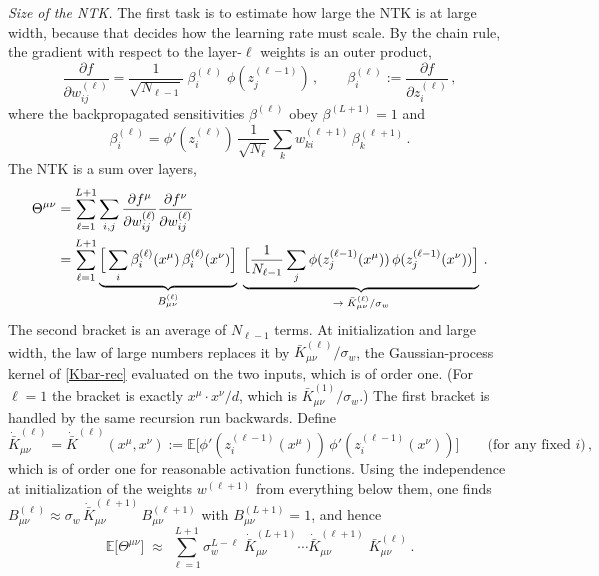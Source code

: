 \documentclass[11pt]{article}
\newcommand{\E}{\mathbb{E}}
\newcommand{\pd}{\partial}
\begin{document}
\emph{Size of the NTK.} The first task is to estimate how large the NTK is at large width, because that decides how the learning rate must scale. By the chain rule, the gradient with respect to the layer-$\ell$ weights is an outer product,
%
\begin{equation}
    \frac{\pd f}{\pd w^{(\ell)}_{ij}} = \frac{1}{\sqrt{N_{\ell-1}}}\;\beta^{(\ell)}_i\;\phi(z^{(\ell-1)}_j)\,,\qquad \beta^{(\ell)}_i := \frac{\pd f}{\pd z^{(\ell)}_i}\,,
\end{equation}
%
where the backpropagated sensitivities $\beta^{(\ell)}$ obey $\beta^{(L+1)} = 1$ and
%
\begin{equation}
    \beta^{(\ell)}_i = \phi'(z^{(\ell)}_i)\,\frac{1}{\sqrt{N_\ell}}\sum_k w^{(\ell+1)}_{ki}\,\beta^{(\ell+1)}_k\,.
\end{equation}
%
The NTK is a sum over layers,
%
\begin{align}
    \Theta^{\mu\nu} &= \sum_{\ell=1}^{L+1}\sum_{i,j}\frac{\pd f^\mu}{\pd w^{(\ell)}_{ij}}\frac{\pd f^\nu}{\pd w^{(\ell)}_{ij}} \notag \\
    &= \sum_{\ell=1}^{L+1} \underbrace{\Big[\sum_i \beta^{(\ell)}_i(x^\mu)\,\beta^{(\ell)}_i(x^\nu)\Big]}_{B^{(\ell)}_{\mu\nu}}\;
    \underbrace{\Big[\frac{1}{N_{\ell-1}}\sum_j \phi(z^{(\ell-1)}_j(x^\mu))\,\phi(z^{(\ell-1)}_j(x^\nu))\Big]}_{\to\;\bar K^{(\ell)}_{\mu\nu}/\sigma_w}\,. \label{NTK-layers}
\end{align}
%
The second bracket is an average of $N_{\ell-1}$ terms. At initialization and large width, the law of large numbers replaces it by $\bar K^{(\ell)}_{\mu\nu}/\sigma_w$, the Gaussian-process kernel of \eqref{Kbar-rec} evaluated on the two inputs, which is of order one. (For $\ell=1$ the bracket is exactly $x^\mu\cdot x^\nu/d$, which is $\bar K^{(1)}_{\mu\nu}/\sigma_w$.) The first bracket is handled by the same recursion run backwards. Define
%
\begin{equation}
    \dot{\bar K}^{(\ell)}_{\mu\nu} = \dot{\bar K}^{(\ell)}(x^\mu,x^\nu):= \E\big[ \phi'(z^{(\ell-1)}_i(x^\mu))\,\phi'(z^{(\ell-1)}_i(x^\nu))\big] \qquad \text{(for any fixed $i$)}\,,
\end{equation}
%
which is of order one for reasonable activation functions. Using the independence at initialization of the weights $w^{(\ell+1)}$ from everything below them, one finds $B^{(\ell)}_{\mu\nu} \approx \sigma_w\,\dot{\bar K}^{(\ell+1)}_{\mu\nu}\,B^{(\ell+1)}_{\mu\nu}$ with $B^{(L+1)}_{\mu\nu}=1$, and hence
%
\begin{equation} \label{NTK-init}
    \E\big[\Theta^{\mu\nu}\big] \;\approx\; \sum_{\ell=1}^{L+1} \sigma_w^{L-\ell}\; \dot{\bar K}^{(L+1)}_{\mu\nu}\cdots \dot{\bar K}^{(\ell+1)}_{\mu\nu}\; \bar K^{(\ell)}_{\mu\nu}\,.
\end{equation}
\end{document}
